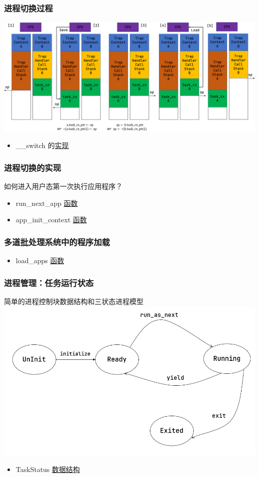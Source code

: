 \begin{frame}
    \frametitle{进程切换过程}
% 
\includegraphics[width=0.9\linewidth]{figs/switch.png}
% 
    \begin{itemize}
        \item \_\_switch 的\href{https://gitee.com/rcore-os/rCore-Tutorial-v3/blob/ch3-coop/os/src/task/switch.S\#L10}{实现}
    \end{itemize}

\end{frame}
\begin{frame}
    \frametitle{进程切换的实现}
% 
如何进入用户态第一次执行应用程序？
% 
\begin{itemize}
    \item run\_next\_app \href{https://gitee.com/rcore-os/rCore-Tutorial-v3/blob/ch2/os/src/batch.rs\#L116}{函数}
    \item app\_init\_context \href{https://gitee.com/rcore-os/rCore-Tutorial-v3/blob/ch2/os/src/trap/context.rs\#L12}{函数}
\end{itemize}
\end{frame}
\begin{frame}
    \frametitle{多道批处理系统中的程序加载}
% 
\begin{itemize}
    \item load\_apps \href{https://gitee.com/rcore-os/rCore-Tutorial-v3/blob/ch3-coop/os/src/loader.rs\#L55}{函数}
\end{itemize}
\end{frame}
\begin{frame}
    \frametitle{进程管理：任务运行状态}
% 
简单的进程控制块数据结构和三状态进程模型
% 
\includegraphics[width=0.6\linewidth]{figs/fsm-coop.png}
% 
\begin{itemize}
    \item  TaskStatus \href{https://gitee.com/rcore-os/rCore-Tutorial-v3/blob/ch3-coop/os/src/task/task.rs\#L13}{数据结构}
\end{itemize}
\end{frame}
